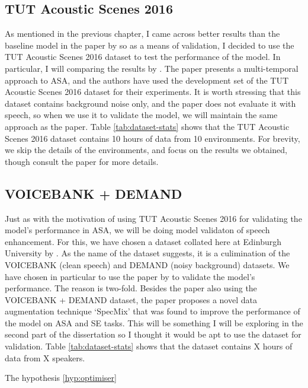 \documentclass[logo,bsc,singlespacing,parskip,online]{infthesis}
\begin{document}
\subsection{TUT Acoustic Scenes 2016}
As mentioned in the previous chapter, I came across better results than the baseline model in the paper by \citet{Huwel2020HearDS} 
so as a means of validation, I decided to use the TUT Acoustic Scenes 2016 dataset \cite{mesaros_tut_2016} to test the performance of the model.
In particular, I will comparing the results by \citet{schindler_multi-temporal_2018}. The paper presents a multi-temporal approach to ASA, and 
the authors have used the development set of the TUT Acoustic Scenes 2016 dataset for their experiments. It is worth stressing 
that this dataset contains background noise only, and the paper does not evaluate it with speech, so when we use it to validate 
the model, we will maintain the same approach as the paper.
Table \ref{tab:dataset-stats} shows that the TUT Acoustic Scenes 2016 dataset contains 10 hours of data from 10 environments.
For brevity, we skip the details of the environments, and focus on the results we obtained, though consult the paper for more details.

\subsection{VOICEBANK + DEMAND}
Just as with the motivation of using TUT Acoustic Scenes 2016 for validating the model's performance in ASA,
we will be doing model validaton of speech enhancement. 
For this, we have chosen a dataset collated here at Edinburgh University by \citet{valentini-botinhao_speech_2016}. 
As the name of the dataset suggests, it is a culimination of the VOICEBANK \cite{TODO} (clean speech) and DEMAND \cite{TODO} (noisy background) datasets.
We have chosen in particular to use the paper by \citet{kim_specmix_2021} to validate the model's performance.
The reason is two-fold. Besides the paper also using the VOICEBANK + DEMAND dataset, the paper proposes a novel data augmentation technique
`SpecMix' that was found to improve the performance of the model on ASA and SE tasks. This will be something I will be exploring in the 
second part of the dissertation so I thought it would be apt to use the dataset for validation.
Table \ref{tab:dataset-stats} shows that the dataset contains X hours of data from X speakers.

The hypothesis \ref{hyp:optimiser} 
\end{document}
